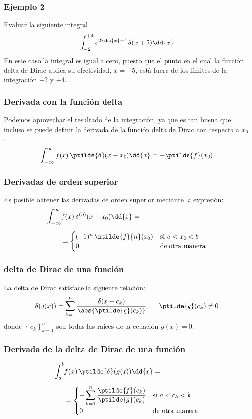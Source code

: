 \begin{frame}
\frametitle{Ejemplo 2}
Evaluar la siguiente integral
\begin{align*}
\int_{-2}^{+4} e^{2 \abs{x}-4} \, \delta(x + 5) \dd{x}
\end{align*}
\pause
En este caso la integral es igual a cero, puesto que el punto en el cual la función delta de Dirac aplica su efectividad, $x = -5$, está fuera de los límites de la integración $-2$ y $+4$.
\end{frame}
\begin{frame}
\frametitle{Derivada con la función delta}
Podemos aprovechar el resultado de la integración, ya que es tan buena que incluso se puede definir la derivada de la función delta de Dirac con respecto a $x_{0}$.
\begin{align*}
\int_{-\infty}^{\infty} f(x) \, \ptilde{\delta} (x - x_{0}) \dd{x} = - \ptilde{f}(x_{0})
\end{align*}
\end{frame}
\begin{frame}
\frametitle{Derivadas de orden superior}
Es posible obtener las derivadas de orden superior mediante la expresión:
\begin{align*}
\int_{-\infty}^{\infty} &f(x) \, \delta^{(n)} (x - x_{0}) \dd{x} = \\[0.5em]
&= \begin{cases}
(-1)^{n} \, \ntilde{f}{n} (x_{0}) & \mbox{si } a < x_{0} < b \\
0 & \mbox{de otra manera}
\end{cases}
\end{align*}   
\end{frame}
\begin{frame}
\frametitle{delta de Dirac de una función}
La delta de Dirac satisface la siguente relación:
\begin{align*}
\delta(g(x)) = \sum_{k=1}^{n} \dfrac{\delta(x - c_{k})}{\abs{\ptilde{g}(c_{k})}}, \hspace{0.5cm} \ptilde{g}(c_{k}) \neq 0
\end{align*}
donde $\left\{ c_{k} \right\}_{k=1}^{n}$ son todas las raíces de la ecuación $g(x) = 0$.
\end{frame}
\begin{frame}
\frametitle{Derivada de la delta de Dirac de una función}
\begin{align*}
\int_{a}^{b} &f(x) \, \ptilde{\delta}(g(x)) \dd{x} = \\[0.5em]
&= \begin{cases}
- \displaystyle \sum_{k=1}^{n} \dfrac{\ptilde{f}(c_{k})}{\ptilde{g}(c_{k})} & \mbox{si } a < c_{k} < b \\
0 & \mbox{de otra manera}
\end{cases}
\end{align*}
\end{frame}
